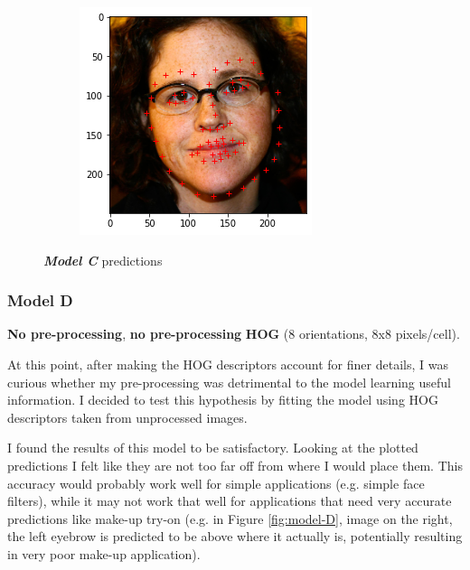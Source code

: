\documentclass{article}
\begin{document}
\begin{figure}[h]
\begin{subfigure}[b]{.35\textwidth}
    \includegraphics[width=\textwidth]{C5}
  \end{subfigure}
  \caption{\textbf{\textit{Model C}} predictions}
  \label{fig:model-C}
\end{figure}

\subsubsection{Model D}
\textbf{No pre-processing}, \textbf{no pre-processing} \textbf{HOG} (8 orientations, 8x8 pixels/cell).

At this point, after making the HOG descriptors account for finer details, I was curious whether my pre-processing was detrimental to the model learning useful information. I decided to test this hypothesis by fitting the model using HOG descriptors taken from unprocessed images.

I found the results of this model to be satisfactory. Looking at the plotted predictions I felt like they are not too far off from where I would place them. This accuracy would probably work well for simple applications (e.g. simple face filters), while it may not work that well for applications that need very accurate predictions like make-up try-on (e.g. in Figure \ref{fig:model-D}, image on the right, the left eyebrow is predicted to be above where it actually is, potentially resulting in very poor make-up application).
\end{document}

